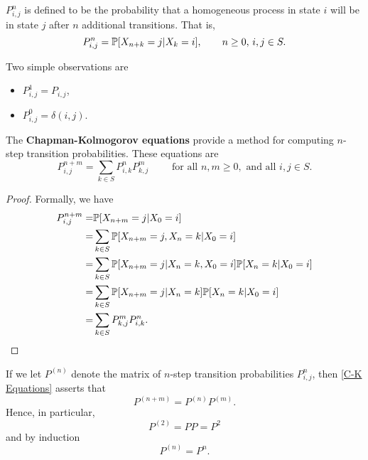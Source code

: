 \begin{definition}
    $P^n_{i,j}$ is defined to be the probability that a homogeneous process in state $i$ will be in state $j$ after $n$ additional transitions. That is,
    $$
    P^n_{i,j} = \mathbb{P}[X_{n+k} = j | X_k = i], \qquad n \ge 0,\, i,j \in S.
    $$
\end{definition}

\begin{remark}
    Two simple observations are
    \begin{itemize}
        \item $P^1_{i,j} = P_{i, j}$,
        \item $P^0_{i, j} = \delta(i, j)$.
    \end{itemize}
\end{remark}

\begin{theorem}
    The \textbf{Chapman-Kolmogorov equations} provide a method for computing $n$-step transition probabilities. These equations are 
    \begin{equation}\label{C-K Equations}
        P^{n+m}_{i,j} = \sum_{k\in S}P_{i, k}^n P_{k, j}^m \qquad \text{ for all } n,m \ge 0, \text{ and all } i,j \in S.
    \end{equation}

    \begin{proof}
        Formally, we have 
        \begin{align*}
            P^{n+m}_{i,j} = & \mathbb{P}[X_{n+m} = j | X_0 = i] \\ 
            = & \sum_{k \in S}\mathbb{P} [X_{n+m} = j, X_n = k | X_0 = i] \\ 
            = & \sum_{k \in S} \mathbb{P} [X_{n+m} = j | X_n = k, X_0 = i]\mathbb{P} [ X_n = k | X_0 = i] \\ 
            = & \sum_{k \in S} \mathbb{P} [X_{n+m} = j | X_n = k] \mathbb{P}[X_n = k | X_0 = i] \\ 
            =& \sum_{k \in S} P^m_{k, j} P^n_{i, k}.
        \end{align*}
    \end{proof}
\end{theorem}

\begin{corollary}
    If we let $P^{(n)}$ denote the matrix of $n$-step transition probabilities $P_{i,j}^n$, then \eqref{C-K Equations} asserts that 
    $$
    P^{(n+m)} = P^{(n)} P^{(m)}.
    $$
    Hence, in particular, 
    $$
    P^{(2)} = P P = P^2
    $$
    and by induction 
    $$
    P^{(n)} = P^n.
    $$
\end{corollary}

